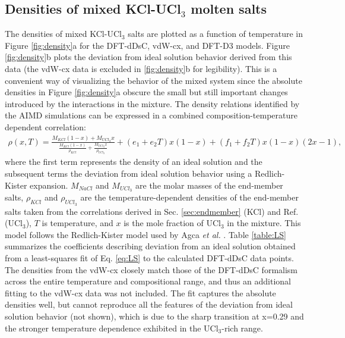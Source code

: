 \documentclass[preprint,3p,10pt,number,sort&compress]{elsarticle}
\begin{document}
\subsection{Densities of mixed KCl-UCl$_3$ molten salts}
The densities of mixed KCl-UCl$_3$ salts are plotted as a function of temperature in Figure \ref{fig:density}a for the DFT-dDsC, vdW-cx, and DFT-D3 models. Figure \ref{fig:density}b plots the deviation from ideal solution behavior derived from this data (the vdW-cx data is excluded in \ref{fig:density}b for legibility). This is a convenient way of visualizing the behavior of the mixed system since the absolute densities in Figure \ref{fig:density}a obscure the small but still important changes introduced by the interactions in the mixture. The density relations identified by the AIMD simulations can be expressed in a combined composition-temperature dependent correlation:
\begin{equation}
\begin{split}
\rho(x,T)=\frac{M_{KCl}(1-x)+M_{UCl_3}x}{\frac{M_{KCl}(1-x)}{\rho_{KCl}}+\frac{M_{UCl_3}x}{\rho_{UCl_3}}}+(e_1+e_2T)x(1-x)+(f_1+f_2T)x(1-x)(2x-1), 
\label{eq:LS}
\end{split}
\end{equation}
\noindent where the first term represents the density of an ideal solution and the subsequent terms the deviation from ideal solution behavior using a Redlich-Kister expansion. $M_{NaCl}$ and $M_{UCl_3}$ are the molar masses of the end-member salts, $\rho_{KCl}$ and $\rho_{UCl_3}$ are the temperature-dependent densities of the end-member salts taken from the correlations derived in Sec. \ref{sec:endmember} (KCl) and Ref.~\cite{Andersson} (UCl$_3$), $T$ is temperature, and $x$ is the mole fraction of UCl$_3$ in the mixture. This model follows the Redlich-Kister model used by Agca \textit{et al.} \cite{agca2022}. Table \ref{table:LS} summarizes the coefficients describing deviation from an ideal solution obtained from a least-squares fit of Eq. \ref{eq:LS} to the calculated DFT-dDsC data points. The densities from the vdW-cx closely match those of the DFT-dDsC formalism across the entire temperature and compositional range, and thus an additional fitting to the vdW-cx data was not included. The fit captures the absolute densities well, but cannot reproduce all the features of the deviation from ideal solution behavior (not shown), which is due to the sharp transition at x=0.29 and the stronger temperature dependence exhibited in the UCl$_3$-rich range.
\end{document}
